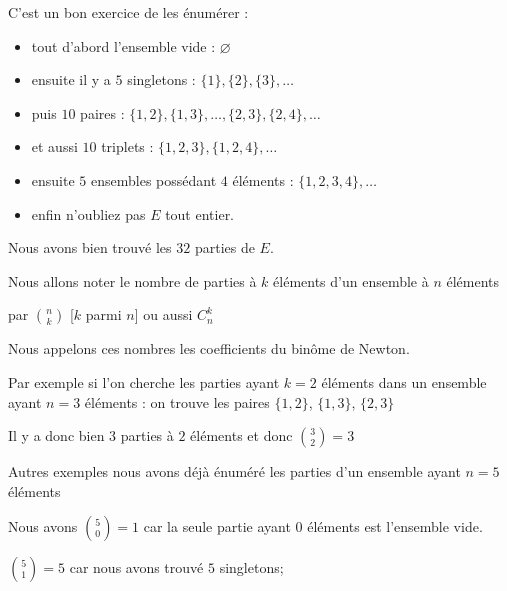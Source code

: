 \change

C'est un bon exercice de les énumérer :

\begin{itemize}
  \item tout d'abord l'ensemble vide : $\varnothing$

\change

  \item ensuite il y a $5$ singletons : $\{1\}, \{2\},\{3\},\ldots$

\change

  \item puis $10$ paires : $\{1,2\}, \{1,3\}, \ldots, \{2,3\},\{2,4\}, \ldots$

\change

 
  \item et aussi $10$ triplets : $\{1,2,3\},\{1,2,4\},\ldots$

\change

  \item ensuite $5$ ensembles possédant $4$ éléments : $\{1,2,3,4\},\ldots$

\change

  \item enfin n'oubliez pas $E$ tout entier.
\end{itemize}

Nous avons bien trouvé les $32$ parties de $E$.


\diapo

Nous allons noter le nombre de parties à $k$ éléments d'un ensemble à $n$ éléments 

par $\binom{n}{k}$ [$k$ parmi $n$] ou aussi $C_n^k$

Nous appelons ces nombres les coefficients du binôme de Newton.

\change

Par exemple si l'on cherche les parties ayant $k=2$ éléments dans un ensemble ayant $n=3$ éléments : 
on trouve les paires $\{1,2\}$, $\{1,3\}$, $\{2,3\}$

Il y a donc bien $3$ parties à $2$ éléments et donc $\binom{3}{2} = 3$

\change

Autres exemples nous avons déjà énuméré les parties d'un ensemble ayant $n=5$ éléments

Nous avons $\binom{5}{0} = 1$
car la seule partie ayant $0$ éléments est l'ensemble vide.

$\binom{5}{1} = 5$ car nous avons trouvé $5$ singletons;

